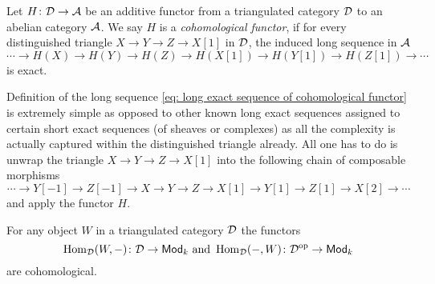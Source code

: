 \begin{definition}
    Let $H\colon \mathcal D \to \mathcal A$ be an additive functor from a triangulated category $\mathcal D$ to an abelian category $\mathcal A$. We say $H$ is a \emph{cohomological functor}, if for every distinguished triangle $X \to Y \to Z \to X[1]$ in $\mathcal D$, the induced long sequence in $\mathcal A$
    \begin{equation}
        \label{eq: long exact sequence of cohomological functor}
        \cdots \to H(X) \to H(Y) \to H(Z) \to H(X[1]) \to H(Y[1]) \to H(Z[1]) \to \cdots
    \end{equation}
    is exact.
\end{definition}

Definition of the long sequence \eqref{eq: long exact sequence of cohomological functor} is extremely simple as opposed to other known long exact sequences assigned to certain short exact sequences (\eg of sheaves or complexes) as all the complexity is actually captured within the distinguished triangle already. All one has to do is unwrap the triangle $X \to Y \to Z \to X[1]$ into the following chain of composable morphisms
\[
    \cdots \to Y[-1] \to Z[-1] \to X \to Y \to Z \to X[1] \to Y[1] \to Z[1] \to X[2] \to \cdots
\]
and apply the functor $H$. 

\begin{example}
    \label{partial homs are cohomological functors}
    For any object $W$ in a triangulated category $\mathcal D$ the functors 
    \[
    \operatorname{Hom}_\mathcal D(W, -) \colon \mathcal D \to \textsf{Mod}_{k} \text{ and } \operatorname{Hom}_\mathcal D( - , W) \colon \mathcal D^{\text{op}} \to \textsf{Mod}_{k}
    \]
    are cohomological.
\end{example}
